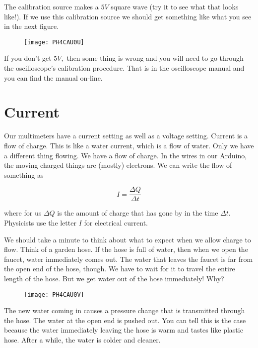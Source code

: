 The calibration source makes a $5\unit{V}$ square wave (try it to see what
that looks like!). If we use this calibration source we should get something
like what you see in the next figure. 

\begin{figure}[h!]
	\centering
    \texttt{[image: PH4CAU0U]}
\end{figure}

If you don't get $5\unit{V},$
then some thing is wrong and you will need to go through the oscilloscope's
calibration procedure. That is in the oscilloscope manual and you can find
the manual on-line.

\section{Current}

Our multimeters have a current setting as well as a voltage setting. Current
is a flow of charge. This is like a water current, which is a flow of water.
Only we have a different thing flowing. We have a flow of charge. In the
wires in our Arduino, the moving charged things are (mostly) electrons. We
can write the flow of something as 

\begin{equation*}
I=\frac{\Delta Q}{\Delta t}
\end{equation*}

where for us $\Delta Q$ is the amount of charge that has gone by in the time 
$\Delta t.$ Physicists use the letter $I$ for electrical current.

We should take a minute to think about what to expect when we allow charge
to flow. Think of a garden hose. If the hose is full of water, then when we
open the faucet, water immediately comes out. The water that leaves the
faucet is far from the open end of the hose, though. We have to wait for it
to travel the entire length of the hose. But we get water out of the hose
immediately! Why? 

\begin{figure}[h!]
	\centering
    \texttt{[image: PH4CAU0V]}
\end{figure}

The new water coming in causes a
pressure change that is transmitted through the hose. The water at the open
end is pushed out. You can tell this is the case because the water
immediately leaving the hose is warm and tastes like plastic hose. After a
while, the water is colder and cleaner.

